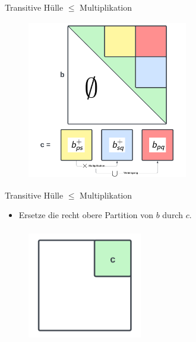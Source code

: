 \documentclass{beamer}
\begin{document}
	\begin{frame}{Transitive Hülle $\le$ Multiplikation}
		\begin{figure}
			\centering
			\includegraphics[width=7cm,height=7cm]{img/LGV3}
		\end{figure}
	\end{frame}


	\begin{frame}{Transitive Hülle $\le$ Multiplikation}
		\begin{itemize}
			\item Ersetze die recht obere Partition von $b$ durch $c$. 
		\end{itemize} 
		\begin{figure}
			\centering
			\includegraphics[width=5cm,height=5cm]{img/LGV5}
		\end{figure}
	\end{frame}
\end{document}
